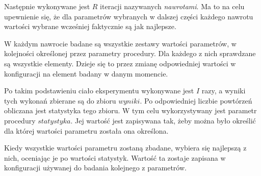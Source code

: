 \documentclass[./FM_mgr.tex]{subfiles}
\begin{document}
Następnie wykonywane jest $R$ iteracji nazywanych \emph{nawrotami}.
Ma to na celu upewnienie się, że dla parametrów wybranych w dalszej części każdego nawrotu wartości wybrane wcześniej faktycznie są jak najlepsze.

W każdym nawrocie badane są wszystkie zestawy wartości parametrów, w kolejności określonej przez parametry procedury.
Dla każdego z nich sprawdzane są wszystkie elementy.
Dzieje się to przez zmianę odpowiedniej wartości w konfiguracji na element badany w danym momencie.

Po takim podstawieniu ciało eksperymentu wykonywane jest $I$ razy, a wyniki tych wykonań zbierane są do zbioru $wyniki$.
Po odpowiedniej liczbie powtórzeń obliczana jest statystyka tego zbioru.
W tym celu wykorzystywany jest parametr procedury $statystyka$.
Jej wartość jest zapisywana tak, żeby można było określić dla której wartości parametru została ona określona.

Kiedy wszystkie wartości parametru zostaną zbadane, wybiera się najlepszą z nich, oceniając je po wartości statystyk.
Wartość ta zostaje zapisana w konfiguracji używanej do badania kolejnego z parametrów.

\end{document}

